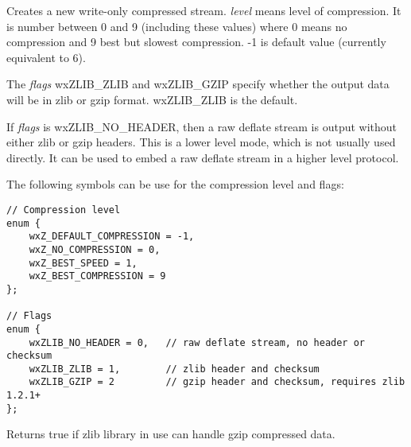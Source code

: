 Creates a new write-only compressed stream. {\it level} means level of 
compression. It is number between 0 and 9 (including these values) where
0 means no compression and 9 best but slowest compression. -1 is default
value (currently equivalent to 6).

The {\it flags} wxZLIB\_ZLIB and wxZLIB\_GZIP specify whether the output data
will be in zlib or gzip format. wxZLIB\_ZLIB is the default.

If {\it flags} is wxZLIB\_NO\_HEADER, then a raw deflate stream is output
without either zlib or gzip headers. This is a lower level
mode, which is not usually used directly. It can be used to embed a raw
deflate stream in a higher level protocol.

The following symbols can be use for the compression level and flags:

\begin{verbatim}
// Compression level
enum {
    wxZ_DEFAULT_COMPRESSION = -1,
    wxZ_NO_COMPRESSION = 0,
    wxZ_BEST_SPEED = 1,
    wxZ_BEST_COMPRESSION = 9
};

// Flags
enum {
    wxZLIB_NO_HEADER = 0,   // raw deflate stream, no header or checksum
    wxZLIB_ZLIB = 1,        // zlib header and checksum
    wxZLIB_GZIP = 2         // gzip header and checksum, requires zlib 1.2.1+
};
\end{verbatim}

\label{wxoutputstreamcanhandlegzip}


Returns true if zlib library in use can handle gzip compressed data.

